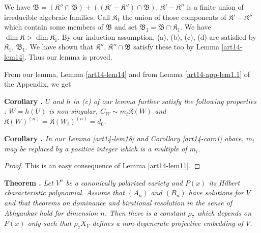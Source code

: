 We have $\mathfrak{B}=(\mathfrak{K}''\cap \mathfrak{B})+((\mathfrak{K}'-\mathfrak{K}'')\cap \mathfrak{B})$. $\mathfrak{K}'-\mathfrak{K}''$ is a finite union of irreducible algebraic families. Call $\mathfrak{K}_{1}$ the union of those components of $\mathfrak{K}'-\mathfrak{K}''$ which contain some members of $\mathfrak{B}$ and set $\mathfrak{B}_{1}=\mathfrak{B}\cap \mathfrak{K}_{1}$. We have $\dim \mathfrak{K}>\dim \mathfrak{K}_{1}$. By our induction assumption, (a), (b), (c), (d) are satisfied by $\mathfrak{K}_{1}$, $\mathfrak{B}_{1}$. We have shown that $\mathfrak{K}''$, $\mathfrak{K}''\cap \mathfrak{B}$ satisfy these too by Lemma \ref{art14-lem14}. Thus our lemma is proved.

From our lemma, Lemma \ref{art14-lem14} and from Lemma \ref{art14-app-lem1.1} of the Appendix, we get

\medskip
\noindent
{\bf Corollary .\label{art14-coro1}}
{\em $U$ and $h$ in {\rm(c)} of our lemma further satisfy the following properties : $W=h(U)$ is non-singular, $C_{W}\sim m_{i}\mathfrak{K}(W)$ and $\mathfrak{K}(W)^{(n)}=\mathfrak{K}(W_{i})^{(n)}=d_{0}$.}

\medskip
\noindent
{\bf Corollary .\label{art14-coro2}}
{\em In our Lemma \ref{art14-lem18} and Corollary \ref{art14-coro1} above, $m_{i}$ may be replaced by a positive integer which is a multiple of $m_{i}$.}

\begin{proof}
This is an easy consequence of Lemma \ref{art14-lem11}.
\end{proof}

\smallskip
\noindent
{\bf Theorem .\label{art14-thm2}}
{\em Let $V^{n}$ be a canonically polarized variety and $P(x)$ its Hilbert characteristic polynomial. Assume that $(A_{n})$ and $(B_{n})$ have solutions for $V$ and that theorems on dominance and birational resolution in the sense of Abhyankar hold for dimension $n$. Then there is a constant $\rho_{7}$ which depends on $P(x)$ only such that $\rho_{7}X_{V}$ defines a non-degenerate projective embedding of $V$.}

